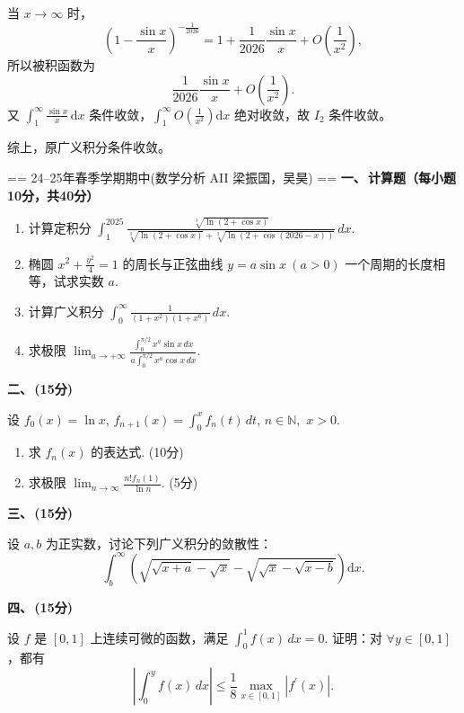 \begin{enumerate}
    当 $x \to \infty$ 时，
    \[
    \left(1 - \frac{\sin x}{x}\right)^{-\frac{1}{2026}}
    = 1 + \frac{1}{2026} \frac{\sin x}{x} + O\left(\frac{1}{x^2}\right),
    \]
    所以被积函数为
    \[
    \frac{1}{2026} \frac{\sin x}{x} + O\left(\frac{1}{x^2}\right).
    \]
    又 $\displaystyle \int_1^\infty \frac{\sin x}{x}\,\mathrm{d}x$ 条件收敛，$\displaystyle \int_1^\infty O\left(\frac{1}{x^2}\right)\mathrm{d}x$ 绝对收敛，故 $I_2$ 条件收敛。

    综上，原广义积分条件收敛。
\end{enumerate}

== 24--25年春季学期期中(数学分析 AII 梁振国，吴昊) ==
\textbf{一、\,计算题（每小题10分，共40分）}

\begin{enumerate}
    \item 计算定积分 $\displaystyle\int_{1}^{2025} \frac{\sqrt[3]{\ln(2+\cos x)}}{\sqrt[3]{\ln(2+\cos x)}+\sqrt[3]{\ln(2+\cos(2026-x))}} \,dx$.

    \item 椭圆 $\displaystyle x^{2}+\frac{y^{2}}{4}=1$ 的周长与正弦曲线 $y = a \sin x\ (a>0)$ 一个周期的长度相等，试求实数 $a$.

    \item 计算广义积分 $\displaystyle\int_{0}^{\infty}\frac{1}{(1+x^{2})(1+x^{6})}\,dx$.

    \item 求极限 $\displaystyle\lim_{a\to+\infty}\frac{\displaystyle\int_{0}^{\pi/2}x^{a}\sin x \,dx}{\displaystyle a\int_{0}^{\pi/2}x^{a}\cos x \,dx}$.
\end{enumerate}

\textbf{二、\,(15分)}

设 $f_{0}(x)=\ln x$, $\displaystyle f_{n+1}(x)=\int_{0}^{x}f_{n}(t)\,dt$, $n\in\mathbb{N},$ $x>0$.
\begin{enumerate}
    \item[(1)] 求 $f_{n}(x)$ 的表达式. (10分)
    \item[(2)] 求极限 $\displaystyle\lim_{n\to\infty}\frac{n!f_{n}(1)}{\ln n}$. (5分)
\end{enumerate}

\textbf{三、\,(15分)}

设 $a, b$ 为正实数，讨论下列广义积分的敛散性：
\[
\int_{b}^{\infty} \left( \sqrt{\sqrt{x+a}-\sqrt{x}} - \sqrt{\sqrt{x}-\sqrt{x-b}} \right) \mathrm{d}x.
\]

\textbf{四、\,(15分)}

设 $f$ 是 $[0,1]$ 上连续可微的函数，满足 $\displaystyle\int_{0}^{1}f(x)\,dx=0$. 证明：对 $\forall y\in[0,1]$，都有
\[
\left|\int_{0}^{y}f(x)\,dx\right| \le \frac{1}{8}\max_{x\in[0,1]}|f^{\prime}(x)|.
\]

